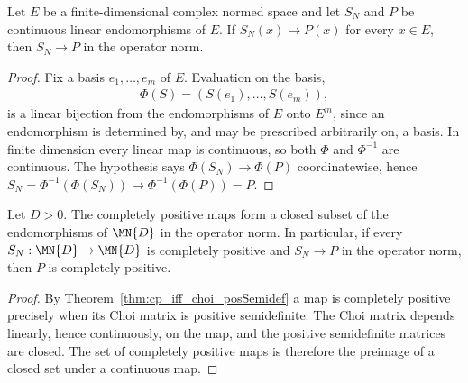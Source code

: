 \begin{lemma}
    \label{lem:tendsto_clm_of_tendsto_apply}
    \leanok
    Let $E$ be a finite-dimensional complex normed space and let $S_N$ and $P$
    be continuous linear endomorphisms of $E$. If $S_N(x)\to P(x)$ for every
    $x\in E$, then $S_N\to P$ in the operator norm.
\end{lemma}

\begin{proof}\leanok
    Fix a basis $e_1,\dots,e_m$ of $E$. Evaluation on the basis,
    \begin{align}
        \Phi(S)=(S(e_1),\dots,S(e_m)),
    \end{align}
    is a linear bijection from the endomorphisms of $E$ onto $E^m$, since an
    endomorphism is determined by, and may be prescribed arbitrarily on, a
    basis. In finite dimension every linear map is continuous, so both $\Phi$
    and $\Phi^{-1}$ are continuous. The hypothesis says $\Phi(S_N)\to\Phi(P)$
    coordinatewise, hence $S_N=\Phi^{-1}(\Phi(S_N))\to\Phi^{-1}(\Phi(P))=P$.
\end{proof}

\begin{lemma}
    \label{lem:cp_maps_closed}
    \leanok
    Let $D>0$. The completely positive maps form a closed subset of the
    endomorphisms of $\MN{D}$ in the operator norm. In particular, if every
    $S_N:\MN{D}\to\MN{D}$ is completely positive and $S_N\to P$ in the
    operator norm, then $P$ is completely positive.
\end{lemma}

\begin{proof}\leanok
    By Theorem~\ref{thm:cp_iff_choi_posSemidef} a map is completely positive
    precisely when its Choi matrix is positive semidefinite. The Choi matrix
    depends linearly, hence continuously, on the map, and the positive
    semidefinite matrices are closed. The set of completely positive maps is
    therefore the preimage of a closed set under a continuous map.
\end{proof}

